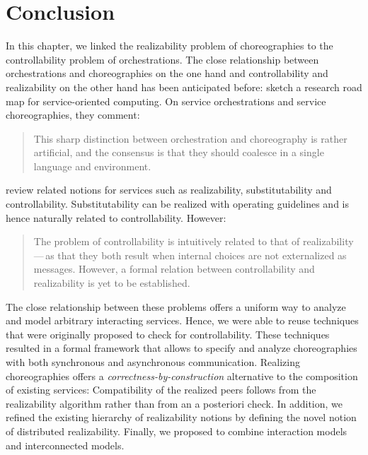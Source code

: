 \section{Conclusion}\label{sect:realizability_conclusion}

In this chapter, we linked the realizability problem of choreographies to the controllability problem of orchestrations. The close relationship between orchestrations and choreographies on the one hand and controllability and realizability on the other hand has been anticipated before: \citet{PapazoglouTDL_2007_ieee} sketch a research road map for service-oriented computing. On service orchestrations and service choreographies, they comment:
\begin{quote}
This sharp distinction between orchestration and choreography is rather artificial, and the consensus is that they should coalesce in a single language and environment.
\end{quote}
\citet{DumasBN_2008_deb} review related notions for services such as realizability, substitutability and controllability. Substitutability can be realized with operating guidelines and is hence naturally related to controllability. However:
\begin{quote}
The problem of controllability is intuitively related to that of realizability\,---\,as that they both result when internal choices are not externalized as messages. However, a formal relation between controllability and realizability is yet to be established.
\end{quote}

The close relationship between these problems offers a uniform way to analyze and model arbitrary interacting services.  Hence, we were able to reuse techniques that were originally proposed to check for controllability. These techniques resulted in a formal framework that allows to specify and analyze choreographies with both synchronous and asynchronous communication. Realizing choreographies offers a \emph{correctness-by-construction} alternative to the composition of existing services: Compatibility of the realized peers follows from the realizability algorithm rather than from an a posteriori check. In addition, we refined the existing hierarchy of realizability notions by defining the novel notion of distributed realizability. Finally, we proposed to combine interaction models and interconnected models.

